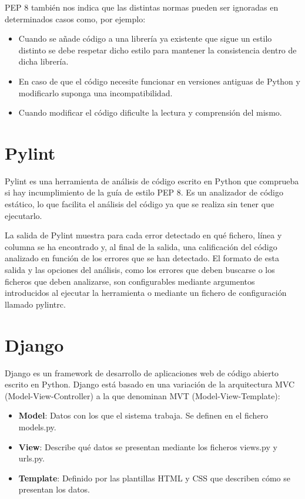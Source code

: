 \documentclass[a4paper, 12pt]{book}
\begin{document}
PEP 8 también nos indica que las distintas normas pueden ser ignoradas en determinados casos como, por ejemplo:
\begin{itemize}
	\item Cuando se añade código a una librería ya existente que sigue un estilo distinto se debe respetar dicho estilo para mantener la consistencia dentro de dicha librería.
	\item En caso de que el código necesite funcionar en versiones antiguas de Python y modificarlo suponga una incompatibilidad.
	\item Cuando modificar el código dificulte la lectura y comprensión del mismo. 
\end{itemize}

\section{Pylint} 
\label{sec:pylint}
Pylint \cite{pylint} es una herramienta de análisis de código escrito en Python que comprueba si hay incumplimiento de la guía de estilo PEP 8. Es un analizador de código estático, lo que facilita el análisis del código ya que se realiza sin tener que ejecutarlo.

La salida de Pylint muestra para cada error detectado en qué fichero, línea y columna se ha encontrado y, al final de la salida, una calificación del código analizado en función de los errores que se han detectado. El formato de esta salida y las opciones del análisis, como los errores que deben buscarse o los ficheros que deben analizarse, son configurables mediante argumentos introducidos al ejecutar la herramienta o mediante un fichero de configuración llamado pylintrc.

\section{Django} 
\label{sec:django}
Django\cite{django} es un framework de desarrollo de aplicaciones web de código abierto escrito en Python. Django está basado en una variación de la arquitectura MVC (Model-View-Controller) a la que denominan MVT (Model-View-Template):
\begin{itemize}
	\item \textbf{Model}: Datos con los que el sistema trabaja. Se definen en el fichero models.py.
	\item \textbf{View}: Describe qué datos se presentan mediante los ficheros views.py y urls.py. 
	\item \textbf{Template}: Definido por las plantillas HTML y CSS que describen cómo se presentan los datos.
\end{itemize}
\end{document}

